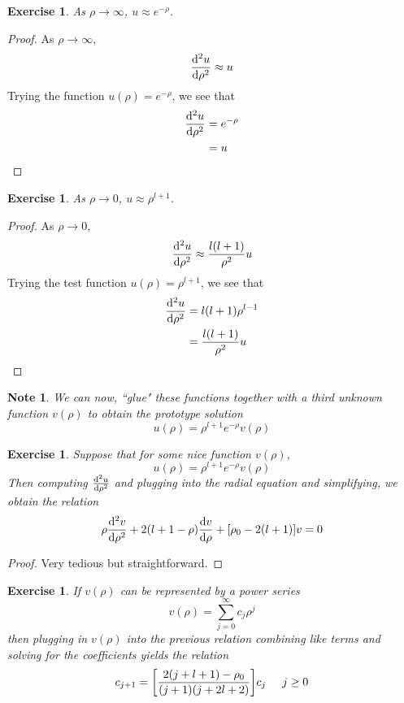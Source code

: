 \documentclass[12pt]{amsart}
\newtheorem{note}[thm]{Note}
\newtheorem{ex}[thm]{Exercise}
\begin{document}
\begin{ex}
As $\rho \rightarrow \infty$, $u \approx e^{-\rho}$.
\end{ex}

\begin{proof}
As $\rho \rightarrow \infty$, $$\dv[2]{u}{\rho} \approx u$$ Trying the function $u(\rho) = e^{-\rho}$, we see that 
\begin{align*}
\dv[2]{u}{\rho} 
&= e^{-\rho} \\
&= u
\end{align*}
\end{proof}

\begin{ex}
As $\rho \rightarrow 0$, $u \approx \rho^{l+1}$.
\end{ex}

\begin{proof}
As $\rho \rightarrow 0$, $$\dv[2]{u}{\rho} \approx \frac{l(l+1)}{\rho^2}u$$ Trying the test function $u(\rho) = \rho^{l+1}$, we see that 
\begin{align*}
\dv[2]{u}{\rho}
&= l(l+1)\rho^{l-1} \\
&= \frac{l(l+1)}{\rho^2}u
\end{align*}
\end{proof}

\begin{note}
We can now, ``glue" these functions together with a third unknown function $v(\rho)$ to obtain the prototype solution $$u(\rho) = \rho^{l+1}e^{-\rho}v(\rho)$$
\end{note}

\begin{ex}
Suppose that for some nice function $v(\rho)$, $$u(\rho) = \rho^{l+1}e^{-\rho}v(\rho)$$ Then computing $\dv[2]{u}{\rho}$ and plugging into the radial equation and simplifying, we obtain the  relation $$\rho \dv[2]{v}{\rho} +2(l+1 - \rho)\dv{v}{\rho} + [\rho_0 - 2(l+1)]v = 0$$
\end{ex}

\begin{proof}
Very tedious but straightforward.
\end{proof}

\begin{ex}
If $v(\rho)$ can be represented by a power series $$v(\rho) = \sum_{j=0}^{\infty}c_j\rho^j$$ then plugging in $v(\rho)$ into the previous relation combining like terms and solving for the coefficients yields the relation $$c_{j+1} = \bigg[ \frac{2(j+l+1) - \rho_0}{(j+1)(j+2l+2)}\bigg]c_j \hspace{5mm} j \geq 0$$ \vspace{3mm} 
\end{ex}
\end{document}
